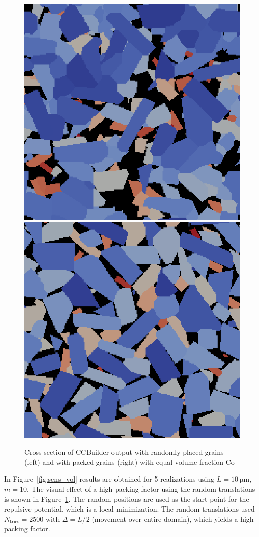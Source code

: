 \documentclass[3p,12pt]{elsarticle}
\newcommand{\Co}{\mathrm{Co}}
\begin{document}
\begin{figure}[H]
 \centering
  \includegraphics[width=0.3\linewidth]{ccbuilder_random_cs}
  \includegraphics[width=0.3\linewidth]{ccbuilder_packed_cs}
  \caption{\label{fig:random_vs_packing} Cross-section of CCBuilder output with randomly placed grains (left) and with packed grains (right) with equal volume fraction Co}
\end{figure}


In Figure~\ref{fig:sens_vol} results are obtained for 5 realizations using $L=\SI{10}{\micro\meter}$, $m=10$.
The visual effect of a high packing factor using the random translations is shown in Figure~\ref{fig:random_vs_packing}.
The random positions are used as the start point for the repulsive potential, which is a local minimization.
The random translations used $N_\text{tries} = 2500$ with $\Delta = L/2$ (movement over entire domain), which yields a high packing factor.

\end{document}
